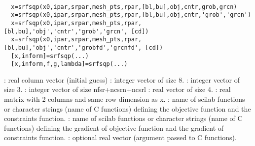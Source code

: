 
\begin{mandesc}
  \\ %
\end{mandesc}
\begin{calling_sequence}
\begin{verbatim}
  x=srfsqp(x0,ipar,srpar,mesh_pts,rpar,[bl,bu],obj,cntr,grob,grcn)  
  x=srfsqp(x0,ipar,srpar,mesh_pts,rpar,[bl,bu],obj,cntr,'grob','grcn')  
  x=srfsqp(x0,ipar,srpar,mesh_pts,rpar,[bl,bu],'obj','cntr','grob','grcn', [cd])  
  x=srfsqp(x0,ipar,srpar,mesh_pts,rpar,[bl,bu],'obj','cntr','grobfd','grcnfd', [cd])  
  [x,inform]=srfsqp(...)  
  [x,inform,f,g,lambda]=srfsqp(...)  
\end{verbatim}
\end{calling_sequence}

\begin{parameters}
  \begin{varlist}
    : real column vector (initial guess)
    : integer vector of size 8.
    : integer vector of size 3.
    : integer vector of size nfsr+ncsrn+ncsrl
    : real vector of size 4.
    \vname{[bl,bu]}
    : real matrix with 2 columns and same row dimension as x.
    : name of scilab functions or character strings (name of C functions) defining the objective function and the constraints function.
    : name of scilab functions or character strings (name of C functions) defining the gradient of objective function and the gradient of  constraints function.
    : optional real vector (argument passed to C functions).
  \end{varlist}
\end{parameters}

